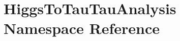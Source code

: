 \hypertarget{namespaceHiggsToTauTauAnalysis}{
\section{HiggsToTauTauAnalysis Namespace Reference}
\label{namespaceHiggsToTauTauAnalysis}
}
